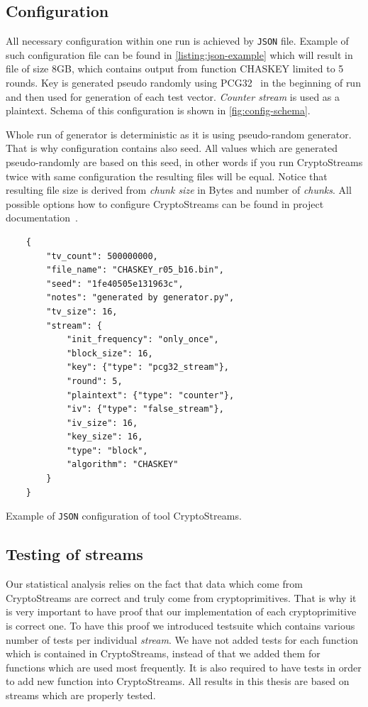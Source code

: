 \documentclass[
    digital,    %
    oneside,    %
    color,
    11pt,
    nocover,
    notable,
    nolof,
    nolot,
    final
]{fithesis3}
\begin{document}
\subsection{Configuration}
\label{subsec:configuration}

All necessary configuration within one run is achieved by \texttt{JSON} file. Example of such configuration file can be found in \cref{listing:json-example} which will result in file of size 8GB, which contains output from function CHASKEY limited to 5 rounds. Key is generated pseudo randomly using PCG32~\cite{pcgGen} in the beginning of run and then used for generation of each test vector. \textit{Counter stream} is used as a plaintext. Schema of this configuration is shown in \cref{fig:config-schema}. 

Whole run of generator is deterministic as it is using pseudo-random generator. That is why configuration contains also seed. All values which are generated pseudo-randomly are based on this seed, in other words if you run CryptoStreams twice with same configuration the resulting files will be equal. Notice that resulting file size is derived from \textit{chunk size} in Bytes and number of \textit{chunks}. All possible options how to configure CryptoStreams can be found in project documentation~\cite{CryptoStreams-wiki}.

\begin{listing}
	\begin{verbatim}
	{
		"tv_count": 500000000,
		"file_name": "CHASKEY_r05_b16.bin",
		"seed": "1fe40505e131963c",
		"notes": "generated by generator.py",
		"tv_size": 16,
		"stream": {
			"init_frequency": "only_once",
			"block_size": 16,
			"key": {"type": "pcg32_stream"},
			"round": 5,
			"plaintext": {"type": "counter"},
			"iv": {"type": "false_stream"},
			"iv_size": 16,
			"key_size": 16,
			"type": "block",
			"algorithm": "CHASKEY"
		}
	}
	\end{verbatim}
	\caption{Example of \texttt{JSON} configuration of tool CryptoStreams.}
	\label{listing:json-example}
\end{listing}

\subsection{Testing of streams}

Our statistical analysis relies on the fact that data which come from CryptoStreams are correct and truly come from cryptoprimitives. That is why it is very important to have proof that our implementation of each cryptoprimitive is correct one. To have this proof we introduced testsuite which contains various number of tests per individual \textit{stream}. We have not added tests for each function which is contained in CryptoStreams, instead of that we added them for functions which are used most frequently. It is also required to have tests in order to add new function into CryptoStreams. All results in this thesis are based on streams which are properly tested.
\end{document}
